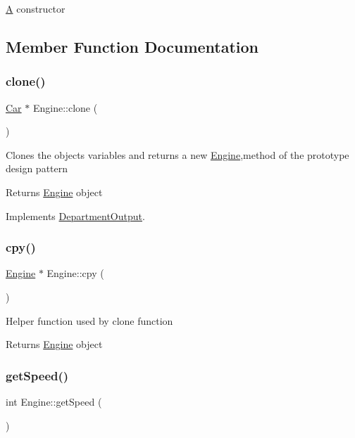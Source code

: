 \hyperlink{classA}{A} constructor 

\subsection{Member Function Documentation}
\mbox{\label{classEngine_a18a3b9d950e67a868420b79890ba1428}} 
\subsubsection{\texorpdfstring{clone()}{clone()}}
{\footnotesize\ttfamily \hyperlink{classCar}{Car} $\ast$ Engine\+::clone (\begin{DoxyParamCaption}{ }\end{DoxyParamCaption})\hspace{0.3cm}{\ttfamily [virtual]}}

Clones the objects variables and returns a new \hyperlink{classEngine}{Engine},method of the prototype design pattern \begin{DoxyReturn}{Returns}
\hyperlink{classEngine}{Engine} object 
\end{DoxyReturn}


Implements \hyperlink{classDepartmentOutput_ab20c9d559bca6ce8e6748dfac47c3f84}{Department\+Output}.

\mbox{\label{classEngine_a9cf97e7e9b82db13748a00256c1e4509}} 
\subsubsection{\texorpdfstring{cpy()}{cpy()}}
{\footnotesize\ttfamily \hyperlink{classEngine}{Engine} $\ast$ Engine\+::cpy (\begin{DoxyParamCaption}{ }\end{DoxyParamCaption})}

Helper function used by clone function \begin{DoxyReturn}{Returns}
\hyperlink{classEngine}{Engine} object 
\end{DoxyReturn}
\mbox{\label{classEngine_a5f828ac1355f02d43f8bae90fbddb131}} 
\subsubsection{\texorpdfstring{get\+Speed()}{getSpeed()}}
{\footnotesize\ttfamily int Engine\+::get\+Speed (\begin{DoxyParamCaption}{ }\end{DoxyParamCaption})\hspace{0.3cm}{\ttfamily [virtual]}}

